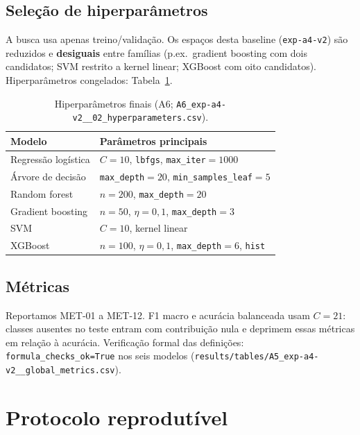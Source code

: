 \documentclass[11pt,a4paper]{article}
\begin{document}
\subsection{Seleção de hiperparâmetros}

A busca usa apenas treino/validação. Os espaços desta baseline
(\texttt{exp-a4-v2}) são reduzidos e \textbf{desiguais} entre famílias (p.ex.\
gradient boosting com dois candidatos; SVM restrito a kernel linear; XGBoost com
oito candidatos). Hiperparâmetros congelados: Tabela~\ref{tab:hp}.

\begin{table}[ht]
\centering
\caption{Hiperparâmetros finais (A6;
\texttt{A6\_exp-a4-v2\_\_02\_hyperparameters.csv}).}
\label{tab:hp}
\small
\begin{tabular}{ll}
\toprule
Modelo & Parâmetros principais \\
\midrule
Regressão logística & $C{=}10$, \texttt{lbfgs}, \texttt{max\_iter}${=}1000$ \\
Árvore de decisão & \texttt{max\_depth}${=}20$, \texttt{min\_samples\_leaf}${=}5$ \\
Random forest & $n{=}200$, \texttt{max\_depth}${=}20$ \\
Gradient boosting & $n{=}50$, $\eta{=}0{,}1$, \texttt{max\_depth}${=}3$ \\
SVM & $C{=}10$, kernel linear \\
XGBoost & $n{=}100$, $\eta{=}0{,}1$, \texttt{max\_depth}${=}6$, \texttt{hist} \\
\bottomrule
\end{tabular}
\end{table}

\subsection{Métricas}

Reportamos MET-01 a MET-12. F1 macro e acurácia balanceada usam $C{=}21$:
classes ausentes no teste entram com contribuição nula e deprimem essas métricas
em relação à acurácia. Verificação formal das definições:
\texttt{formula\_checks\_ok=True} nos seis modelos
(\texttt{results/tables/A5\_exp-a4-v2\_\_global\_metrics.csv}).

\section{Protocolo reprodutível}
\label{sec:protocolo}
\end{document}
